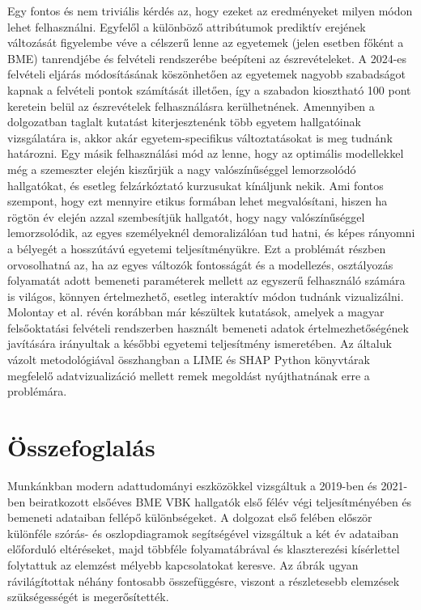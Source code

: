 \documentclass[12pt]{article}
\begin{document}
Egy fontos és nem triviális kérdés az, hogy ezeket az eredményeket milyen módon lehet felhasználni. Egyfelől a különböző attribútumok prediktív erejének változását figyelembe véve a célszerű lenne az egyetemek (jelen esetben főként a BME) tanrendjébe és felvételi rendszerébe beépíteni az észrevételeket. A 2024-es felvételi eljárás módosításának köszönhetően az egyetemek nagyobb szabadságot kapnak a felvételi pontok számítását illetően, így a szabadon kiosztható 100 pont keretein belül az észrevételek felhasználásra kerülhetnének. Amennyiben a dolgozatban taglalt kutatást kiterjesztenénk több egyetem hallgatóinak vizsgálatára is, akkor akár egyetem-specifikus változtatásokat is meg tudnánk határozni. Egy másik felhasználási mód az lenne, hogy az optimális modellekkel még a szemeszter elején kiszűrjük a nagy valószínűséggel lemorzsolódó hallgatókat, és esetleg felzárkóztató kurzusukat kínáljunk nekik. Ami fontos szempont, hogy ezt mennyire etikus formában lehet megvalósítani, hiszen ha rögtön év elején azzal szembesítjük hallgatót, hogy nagy valószínűséggel lemorzsolódik, az egyes személyeknél demoralizálóan tud hatni, és képes rányomni a bélyegét a hosszútávú egyetemi teljesítményükre. Ezt a problémát részben orvosolhatná az, ha az egyes változók fontosságát és a modellezés, osztályozás folyamatát adott bemeneti paraméterek mellett az egyszerű felhasználó számára is világos, könnyen értelmezhető, esetleg interaktív módon tudnánk vizualizálni. Molontay et al. \cite{molontay1, molontay2} révén korábban már készültek kutatások, amelyek a magyar felsőoktatási felvételi rendszerben használt bemeneti adatok értelmezhetőségének javítására irányultak a későbbi egyetemi teljesítmény ismeretében. Az általuk vázolt metodológiával összhangban a LIME \cite{lime} és SHAP \cite{shap} Python könyvtárak megfelelő adatvizualizáció mellett remek megoldást nyújthatnának erre a problémára. 



\section{Összefoglalás}


Munkánkban modern adattudományi eszközökkel vizsgáltuk a 2019-ben és 2021-ben beiratkozott elsőéves BME VBK hallgatók első félév végi teljesítményében és bemeneti adataiban fellépő különbségeket. A dolgozat első felében először különféle szórás- és oszlopdiagramok segítségével vizsgáltuk a két év adataiban előforduló eltéréseket, majd többféle folyamatábrával és klaszterezési kísérlettel folytattuk az elemzést mélyebb kapcsolatokat keresve. Az ábrák ugyan rávilágítottak néhány fontosabb összefüggésre, viszont a részletesebb elemzések szükségességét is megerősítették.
\end{document}
